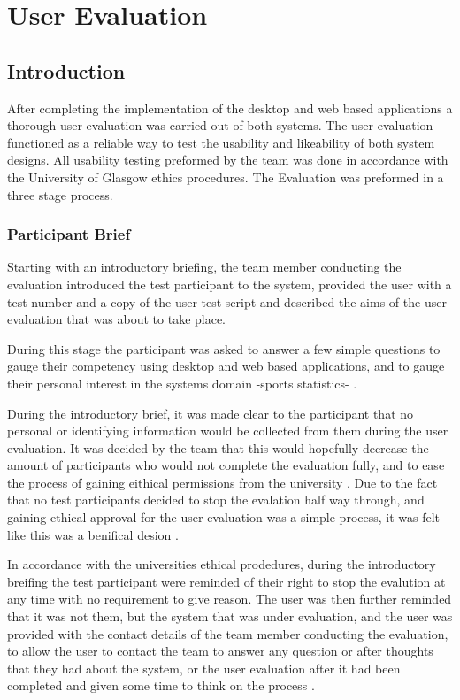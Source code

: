 \section{User Evaluation}

\subsection{Introduction}

After completing the implementation of the desktop and web based applications a thorough user evaluation was carried out of both systems. The user evaluation functioned as a reliable way to test the usability and likeability of both system designs. All usability testing preformed by the team was done in accordance with the University of Glasgow ethics procedures. The Evaluation was preformed in a three stage process. 


\subsubsection{ Participant Brief }

Starting with an introductory briefing, the team member conducting the evaluation introduced the test participant to the system, provided the user with a test number and a copy of the user test script and described the aims of the user evaluation that was about to take place.  

During this stage the participant was asked to answer a few simple questions to gauge their competency using desktop and web based applications, and to gauge their personal interest in the systems domain -sports statistics- .

 During the introductory brief, it was made clear to the participant that no personal or identifying information would be collected from them during the user evaluation.  It was decided by the team that this would hopefully decrease the amount of participants who would not complete the evaluation fully, and to ease the process of gaining eithical permissions from the university . Due to the fact that no test participants decided to stop the evalation half way through, and gaining ethical approval for the user evaluation was a simple process, it was felt like this was a benifical desion . 

In accordance with the universities ethical prodedures, during the introductory breifing the test participant were reminded of their right to stop the evalution at any time with no requirement to give reason. The user was then further reminded that it was not them, but the system that was under evaluation, and the user was provided with the contact details of the team member conducting the evaluation, to allow the user to contact the team to answer any question or after thoughts that they had about the system, or the user evaluation after it had been completed and given some time to think on the process .

